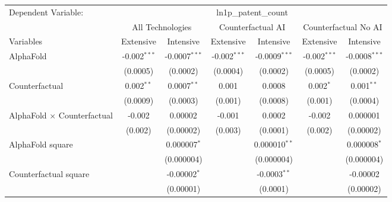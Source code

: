 \begingroup
\centering
\begin{tabular}{lcccccc}
   \tabularnewline \midrule \midrule
   Dependent Variable: & \multicolumn{6}{c}{ln1p\_patent\_count}\\
 & \multicolumn{2}{c}{All Technologies} & \multicolumn{2}{c}{Counterfactual AI} & \multicolumn{2}{c}{Counterfactual No AI} \\
\cmidrule(lr){1-1}\cmidrule(lr){2-3} \cmidrule(lr){4-5} \cmidrule(lr){6-7}
Variables & \multicolumn{1}{c}{Extensive} & \multicolumn{1}{c}{Intensive} & \multicolumn{1}{c}{Extensive} & \multicolumn{1}{c}{Intensive} & \multicolumn{1}{c}{Extensive} & \multicolumn{1}{c}{Intensive} \\
\cmidrule(lr){1-1}\cmidrule(lr){2-2} \cmidrule(lr){3-3} \cmidrule(lr){4-4} \cmidrule(lr){5-5} \cmidrule(lr){6-6} \cmidrule(lr){7-7}
   AlphaFold                          & -0.002$^{***}$ & -0.0007$^{***}$ & -0.002$^{***}$ & -0.0009$^{***}$ & -0.002$^{***}$ & -0.0008$^{***}$\\   
                                      & (0.0005)       & (0.0002)        & (0.0004)       & (0.0002)        & (0.0005)       & (0.0002)\\   
   Counterfactual                     & 0.002$^{**}$   & 0.0007$^{**}$   & 0.001          & 0.0008          & 0.002$^{*}$    & 0.001$^{**}$\\   
                                      & (0.0009)       & (0.0003)        & (0.001)        & (0.0008)        & (0.001)        & (0.0004)\\   
   AlphaFold $\times$ Counterfactual  & -0.002         & 0.00002         & -0.001         & 0.0002          & -0.002         & 0.000001\\   
                                      & (0.002)        & (0.00002)       & (0.003)        & (0.0001)        & (0.002)        & (0.00002)\\   
   AlphaFold square                   &                & 0.000007$^{*}$  &                & 0.000010$^{**}$ &                & 0.000008$^{*}$\\   
                                      &                & (0.000004)      &                & (0.000004)      &                & (0.000004)\\   
   Counterfactual square              &                & -0.00002$^{*}$  &                & -0.0003$^{**}$  &                & -0.00002\\   
                                      &                & (0.00001)       &                & (0.0001)        &                & (0.00002)\\   

\end{tabular}

